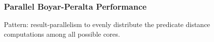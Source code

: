 \documentclass[10pt]{beamer}
\begin{document}
\begin{frame}
	\frametitle{Parallel Boyar-Peralta Performance}
Pattern: result-parallelism to evenly distribute the predicate distance computations among all possible cores.

\begin{figure}
\centering     %
{}
\end{figure}


\end{frame}
\end{document}
